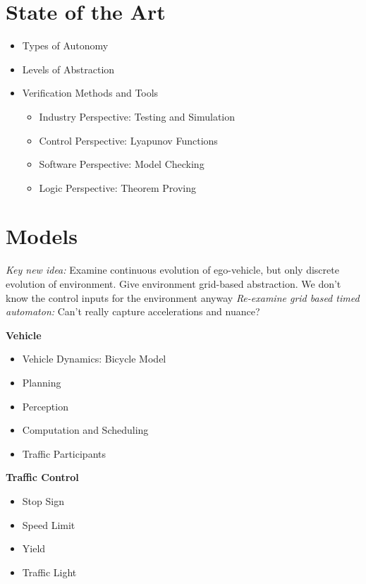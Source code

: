 \documentclass{easychair}
\begin{document}
\section{State of the Art}
\begin{itemize}
	\item Types of Autonomy
	\item Levels of Abstraction
	\item Verification Methods and Tools
	\begin{itemize}
		\item Industry Perspective: Testing and Simulation
		\item Control Perspective: Lyapunov Functions
		\item Software Perspective: Model Checking
		\item Logic Perspective: Theorem Proving
	\end{itemize}
\end{itemize}
\section{Models}
\label{sect:model}
\emph{Key new idea:} Examine continuous evolution of ego-vehicle, but only discrete evolution of environment. Give environment grid-based abstraction. We don't know the control inputs for the environment anyway\newline
\emph{Re-examine grid based timed automaton:} Can't really capture accelerations and nuance? 

\noindent \textbf{Vehicle}
\begin{itemize}
	\item Vehicle Dynamics: Bicycle Model
	\item Planning
	\item Perception
	\item Computation and Scheduling
	\item Traffic Participants
\end{itemize}

\noindent \textbf{Traffic Control}
\begin{itemize}
	\item Stop Sign
	\item Speed Limit
	\item Yield
	\item Traffic Light
\end{itemize}
\end{document}
